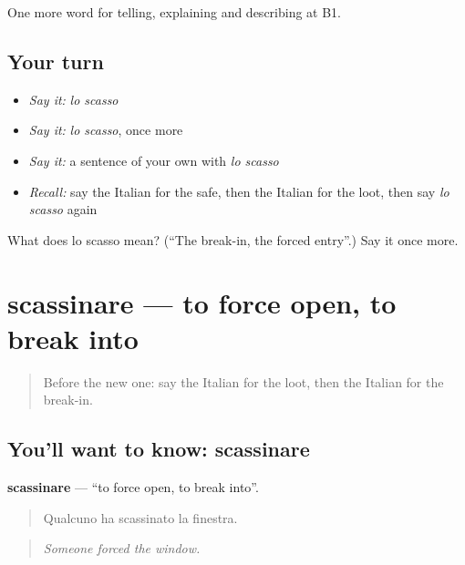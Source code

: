 \begin{grammarlens}[title={What you've built}]
One more word for telling, explaining and describing at B1.
\end{grammarlens}

\subsection*{Your turn}
\begin{itemize}
\raggedright
  \item \emph{Say it:} \emph{lo scasso}
  \item \emph{Say it:} \emph{lo scasso}, once more
  \item \emph{Say it:} a sentence of your own with \emph{lo scasso}
  \item \emph{Recall:} say the Italian for the safe, then the Italian for the loot, then say \emph{lo scasso} again
\end{itemize}

\begin{tcolorbox}[breakable,colback=teal!4,colframe=teal!35!black,title={Before you move on}]
What does lo scasso mean? (\textquotedblleft{}The break-in, the forced entry\textquotedblright{}.) Say it once more.
\end{tcolorbox}
\section[scassinare]{scassinare — to force open, to break into}

\label{lesson:IT-C293-scassinare}



\begin{quote}
Before the new one: say the Italian for the loot, then the Italian for the break-in.
\end{quote}

\subsection*{You'll want to know: scassinare}
\textbf{scassinare} — \textquotedblleft{}to force open, to break into\textquotedblright{}.

\begin{quote}
Qualcuno ha scassinato la finestra.
\end{quote}

\begin{quote}
\emph{Someone forced the window.}
\end{quote}

